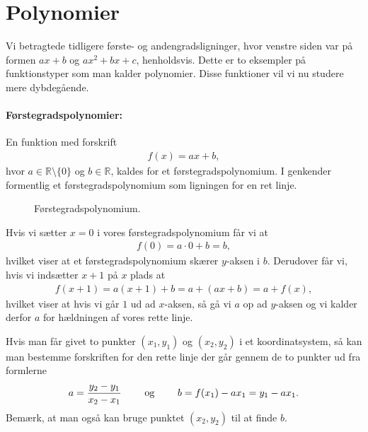 \section{Polynomier}
Vi betragtede tidligere første- og andengradsligninger, hvor venstre siden var på formen $ax+b$ og $ax^2+bx+c$, henholdsvis. Dette er to eksempler på funktionstyper som man kalder polynomier. Disse funktioner vil vi nu studere mere dybdegående. 

\paragraph*{Førstegradspolynomier:}
En funktion med forskrift
\begin{align*}
f(x)=ax+b,
\end{align*}
hvor $a \in \mathbb{R}\setminus \{0\}$ og $b \in \mathbb{R}$, kaldes for et førstegradspolynomium. I genkender formentlig et førstegradspolynomium som ligningen for en ret linje.
\begin{figure}[!htbp]
  \centering
  \caption{Førstegradspolynomium.}
  \label{fig:funktioner3et}
\end{figure}

Hvis vi sætter $x=0$ i vores førstegradspolynomium får vi at 
\begin{align*}
f(0)=a\cdot 0 + b = b,
\end{align*}
hvilket viser at et førstegradspolynomium skærer $y$-aksen i $b$. Derudover får vi, hvis vi indsætter $x+1$ på $x$ plads at
\begin{align*}
f(x+1)=a(x+1)+b = a + (ax+b)=a+f(x),
\end{align*}
hvilket viser at hvis vi går $1$ ud ad $x$-aksen, så gå vi $a$ op ad $y$-aksen og vi kalder derfor $a$ for hældningen af vores rette linje.

Hvis man får givet to punkter $(x_1,y_1)$ og $(x_2,y_2)$ i et koordinatsystem, så kan man bestemme forskriften for den rette linje der går gennem de to punkter ud fra formlerne
\begin{align*}
a= \frac{y_2-y_1}{x_2-x_1} \qquad \textup{ og } \qquad b= f(x_1)-ax_1 = y_1 - ax_1.
\end{align*}
Bemærk, at man også kan bruge punktet $(x_2,y_2)$ til at finde $b$.

